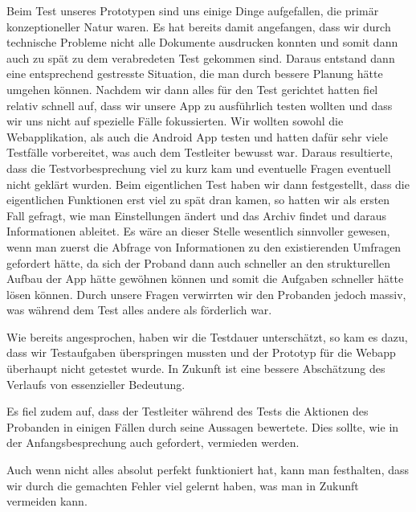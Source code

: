 Beim Test unseres Prototypen sind uns einige Dinge aufgefallen, die primär konzeptioneller Natur waren. Es hat bereits damit angefangen, dass wir durch technische Probleme nicht alle Dokumente ausdrucken konnten und somit dann auch zu spät zu dem verabredeten Test gekommen sind. Daraus entstand dann eine entsprechend gestresste Situation, die man durch bessere Planung hätte umgehen können. 
Nachdem wir dann alles für den Test gerichtet hatten fiel relativ schnell auf, dass wir unsere App zu ausführlich testen wollten und dass wir uns nicht auf spezielle Fälle fokussierten. Wir wollten sowohl die Webapplikation, als auch die Android App testen und hatten dafür sehr viele Testfälle vorbereitet, was auch dem Testleiter bewusst war. Daraus resultierte, dass die Testvorbesprechung viel zu kurz kam und eventuelle Fragen eventuell nicht geklärt wurden.
Beim eigentlichen Test haben wir dann festgestellt, dass die eigentlichen Funktionen erst viel zu spät dran kamen, so hatten wir als ersten Fall gefragt, wie man Einstellungen ändert und das Archiv findet und daraus Informationen ableitet. Es wäre an dieser Stelle wesentlich sinnvoller gewesen, wenn man zuerst die Abfrage von Informationen zu den existierenden Umfragen gefordert hätte, da sich der Proband dann auch schneller an den strukturellen Aufbau der App hätte gewöhnen können und somit die Aufgaben schneller hätte lösen können. Durch unsere Fragen verwirrten wir den Probanden jedoch massiv, was während dem Test alles andere als förderlich war.

Wie bereits angesprochen, haben wir die Testdauer unterschätzt, so kam es dazu, dass wir Testaufgaben überspringen mussten und der Prototyp für die Webapp überhaupt nicht getestet wurde. In Zukunft ist eine bessere Abschätzung des Verlaufs von essenzieller Bedeutung.

Es fiel zudem auf, dass der Testleiter während des Tests die Aktionen des Probanden in einigen Fällen durch seine Aussagen bewertete. Dies sollte, wie in der Anfangsbesprechung auch gefordert, vermieden werden.

Auch wenn nicht alles absolut perfekt funktioniert hat, kann man festhalten, dass wir durch die gemachten Fehler viel gelernt haben, was man in Zukunft vermeiden kann.

\clearpage